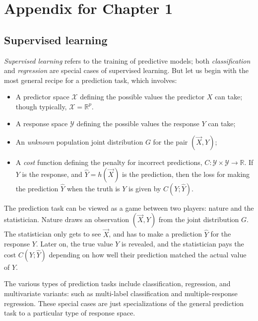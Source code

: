 
\chapter{Appendix for Chapter 1} %

\label{AppendixA} %


\section{Supervised learning}\label{sec:sup_learn}

\emph{Supervised learning} refers to the training of predictive
models; both \emph{classification} and \emph{regression} are special
cases of supervised learning.  But let us begin with the most general
recipe for a prediction task, which involves:

\begin{itemize}
\item A predictor space $\mathcal{X}$ defining the possible values the
  predictor $X$ can take; though typically, $\mathcal{X} =
  \mathbb{R}^p$.
\item A response space $\mathcal{Y}$ defining the possible values the response $Y$ can take;
\item An \emph{unknown} population joint distribution $G$ for the pair $(\vec{X}, Y)$;
\item A \emph{cost} function defining the penalty for incorrect
  predictions, $C: \mathcal{Y} \times \mathcal{Y} \to \mathbb{R}$.  If
  $Y$ is the response, and $\hat{Y} = h(\vec{X})$ is the prediction, then
  the loss for making the prediction $\hat{Y}$ when the truth is $Y$
  is given by $C(Y; \hat{Y})$.
\end{itemize}

The prediction task can be viewed as a game between two players:
nature and the statistician.  Nature draws an observation $(\vec{X},
Y)$ from the joint distribution $G$.  The statistician only gets to
see $\vec{X}$, and has to make a prediction $\hat{Y}$ for the response
$Y$.  Later on, the true value $Y$ is revealed, and the statistician
pays the cost $C(Y; \hat{Y})$ depending on how well their prediction
matched the actual value of $Y$.

The various types of prediction tasks include classification,
regression, and multivariate variants: such as multi-label
classification and multiple-response regression.  These special cases
are just specializations of the general prediction task to a
particular type of response space.

